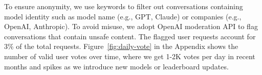 \documentclass{article}
\newcommand{\showcomments}{yes}
\newcommand{\system}{Chatbot Arena\xspace}
\newcommand\todo[1]{\ifthenelse{\equal{\showcomments}{yes}}{{\color{red} TODO: #1}}{\ignorespaces}}
\begin{document}

To ensure anonymity, we use keywords to filter out conversations containing model identity such as model name (e.g., GPT, Claude) or companies (e.g., OpenAI, Anthropic).
To avoid misuse, we adopt OpenAI moderation API to flag conversations that contain unsafe content.
The flagged user requests account for 3\% of the total requests.
Figure~\ref{fig:daily-vote} in the Appendix shows the number of valid user votes over time, where we get 1-2K votes per day in recent months and spikes as we introduce new models or leaderboard updates.





\end{document}
